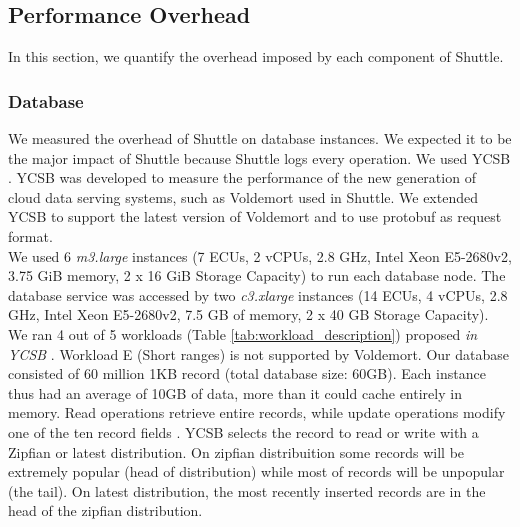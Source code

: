 \subsection{Performance Overhead}\label{sec:eval:performance}
In this section, we quantify the overhead imposed by each component of Shuttle.

\subsubsection{Database}\label{sec:eval:performance:database}
We measured the overhead of Shuttle on database instances. We expected it to be the major impact of Shuttle because Shuttle logs every operation. We used \ac{YCSB} \cite{ycsb}. \ac{YCSB} was developed to measure the performance of the new generation of cloud data serving systems, such as Voldemort used in Shuttle. We extended \ac{YCSB} to support the latest version of Voldemort and to use \ac{protobuf} as request format.\\

We used 6 \textit{m3.large} instances (7 \ac{ECU}s, 2 vCPUs, 2.8 GHz, Intel Xeon E5-2680v2, 3.75 GiB memory, 2 x 16 GiB Storage Capacity) to run each database node. The database service was accessed by two \textit{c3.xlarge} instances (14 \ac{ECU}s, 4 vCPUs, 2.8 GHz, Intel Xeon E5-2680v2, 7.5 GB of memory, 2 x 40 GB Storage Capacity).\\


We ran 4 out of 5 workloads (Table \ref{tab:workload_description}) proposed \emph{in} \emph{YCSB} \cite{ycsb}. Workload E (Short ranges) is not supported by Voldemort. Our database consisted of 60 million 1KB record (total database size: 60GB). Each instance thus had an average of 10GB of data, more than it could cache entirely in memory. Read operations retrieve entire records, while update operations modify one of the ten record fields \cite{ycsb}. YCSB selects the record to read or write with a Zipfian or latest distribution. On zipfian distribuition some records will be extremely popular (head of distribution) while most of records will be unpopular (the tail). On latest distribution, the most recently inserted records are in the head of the zipfian distribution. 

